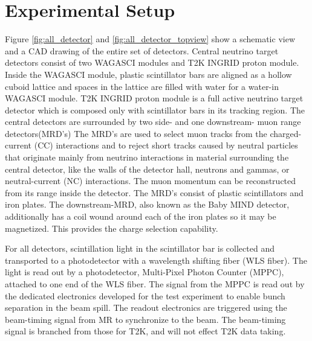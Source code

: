 \section{Experimental Setup}
Figure \ref{fig:all_detector} and \ref{fig:all_detector_topview} show a schematic view and a CAD drawing of the entire set of detectors.
Central neutrino target detectors consist of two WAGASCI modules and T2K INGRID proton module. 
Inside the WAGASCI module, plastic scintillator bars are aligned as a hollow cuboid lattice
and spaces in the lattice are filled with water for a water-in WAGASCI module.
T2K INGRID proton module is a full active neutrino target detector which is composed only with scintillator bars in its tracking region. 
The central detectors are surrounded by two side- and one downstream- muon range detectors(MRD's)
The MRD's are used to select muon tracks from the charged-current (CC) interactions 
and to reject short tracks caused by neutral particles 
that originate mainly from neutrino interactions in material surrounding the central detector, like the walls of the detector hall,
neutrons and gammas, or neutral-current (NC) interactions.
The muon momentum can be reconstructed from its range inside the detector.
The MRD's consist of plastic scintillators and iron plates.
The downstream-MRD, also known as the Baby MIND detector, additionally has a coil wound around each of the iron plates so it may
be magnetized. This provides the charge selection capability.


For all detectors, scintillation light in the scintillator bar is collected and transported to a photodetector with a wavelength shifting fiber (WLS fiber).
The light is read out by a photodetector, Multi-Pixel Photon Counter (MPPC), attached to one end of the WLS fiber.
The signal from the MPPC is read out by the dedicated electronics developed for the test experiment
to enable bunch separation in the beam spill.
The readout electronics are triggered using the beam-timing signal from MR to synchronize to the beam.
The beam-timing signal is branched from those for T2K, and will not effect T2K data taking.

